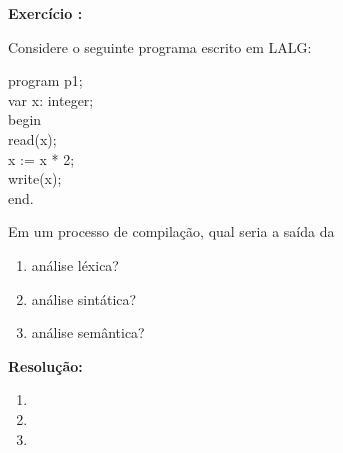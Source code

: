 

\setcounter{count}{0}
\renewcommand{\labelenumi}{\alph{enumi}.}
\newcommand{\exercise}[2]{%
  \stepcounter{count}%
  \noindent\textbf{Exercício \thecount:}

  #1
  
  \vspace{\baselineskip}%
  \noindent\textbf{Resolução:}%
  \vspace{\baselineskip}%
  
  #2 
  
  \vspace{2\baselineskip}%
}


\maketitle

\exercise{
	Considere o seguinte programa escrito em LALG:

	program p1;\\
	var x: integer;\\
	begin\\
	\hspace*{2em} read(x);\\
	\hspace*{2em} x := x * 2;\\
	\hspace*{2em} write(x);\\
	end.

	Em um processo de compilação, qual seria a saída da

	\begin{enumerate}
		\item análise léxica?
		\item análise sintática?
		\item análise semântica?
	\end{enumerate}
} {
	\begin{enumerate}
		\item
		\item
		\item
	\end{enumerate}
}

